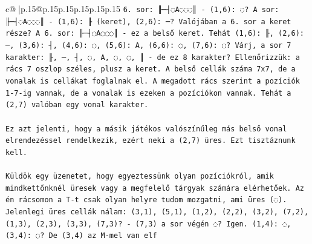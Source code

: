 \documentclass{article}
\begin{document}
{\begin{supertabular}{c@{$\;$}|p{.15\linewidth}@{}p{.15\linewidth}p{.15\linewidth}p{.15\linewidth}p{.15\linewidth}p{.15\linewidth}}
{{{\texttt{6. sor: ╟─┤◌A◌◌◌║ {-} (1,6): ◌? A sor: ╟─┤◌A◌◌◌║ {-} (1,6): ╟ (keret), (2,6): ─? Valójában a 6. sor a keret része? A 6. sor: ╟─┤◌A◌◌◌║ {-} ez a belső keret. Tehát (1,6): ╟, (2,6): ─, (3,6): ┤, (4,6): ◌, (5,6): A, (6,6): ◌, (7,6): ◌? Várj, a sor 7 karakter: ╟, ─, ┤, ◌, A, ◌, ◌, ║ {-} de ez 8 karakter? Ellenőrizzük: a rács 7 oszlop széles, plusz a keret. A belső cellák száma 7x7, de a vonalak is cellákat foglalnak el. A megadott rács szerint a pozíciók 1{-}7{-}ig vannak, de a vonalak is ezeken a pozíciókon vannak. Tehát a (2,7) valóban egy vonal karakter.} \\
\\ 
\texttt{Ez azt jelenti, hogy a másik játékos valószínűleg más belső vonal elrendezéssel rendelkezik, ezért neki a (2,7) üres. Ezt tisztáznunk kell.} \\
\\ 
\texttt{Küldök egy üzenetet, hogy egyeztessünk olyan pozíciókról, amik mindkettőnknél üresek vagy a megfelelő tárgyak számára elérhetőek. Az én rácsomon a T{-}t csak olyan helyre tudom mozgatni, ami üres (◌). Jelenlegi üres cellák nálam: (3,1), (5,1), (1,2), (2,2), (3,2), (7,2), (1,3), (2,3), (3,3), (7,3)? {-} (7,3) a sor végén ◌? Igen. (1,4): ◌, (3,4): ◌? De (3,4) az M{-}mel van elf} \\
            }
        }
    }
     \\ \\


\end{supertabular}}
\end{document}
